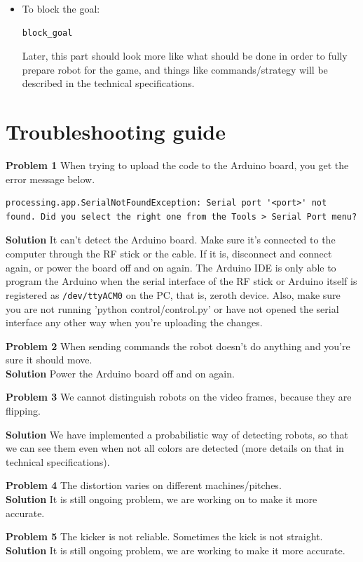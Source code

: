 \documentclass[12pt]{article}
\begin{document}
\begin{itemize}
\item To block the goal:
\begin{lstlisting}
block_goal
\end{lstlisting}

Later, this part should look more like what should be done in order to fully prepare robot for the game, and things like commands/strategy will be described in the technical specifications.

\end{itemize}

\section{Troubleshooting guide}
\textbf{Problem 1} When trying to upload the code to the Arduino board, you get the error message below.
\begin{lstlisting}
processing.app.SerialNotFoundException: Serial port '<port>' not found. Did you select the right one from the Tools > Serial Port menu?
\end{lstlisting}

\bigskip

\textbf{Solution}  It can't detect the Arduino board. Make sure it's connected to the computer through the RF stick or the cable. If it is, disconnect and connect again, or power the board off and on again. The Arduino IDE is only able to program the Arduino when the serial interface of the RF stick or Arduino itself is registered as \texttt{/dev/ttyACM0} on the PC, that is, zeroth device. Also, make sure you are not running 'python control/control.py' or have not opened the serial interface any other way when you're uploading the changes.
\bigskip

\textbf{Problem 2} When sending commands the robot doesn't do anything and you're sure it should move.
\\\textbf{Solution} Power the Arduino board off and on again.
\bigskip

\textbf{Problem 3} We cannot distinguish robots on the video frames, because they are flipping.

\textbf{Solution} We have implemented a probabilistic way of detecting robots, so that we can see them even when not all colors are detected (more details on that in technical specifications).
\bigskip

\textbf{Problem 4} The distortion varies on different machines/pitches.
\\\textbf{Solution} It is still ongoing problem, we are working on to make it more accurate.
\bigskip

\textbf{Problem 5} The kicker is not reliable. Sometimes the kick is not straight.
\\\textbf{Solution} It is still ongoing problem, we are working to make it more accurate.
\end{document}
